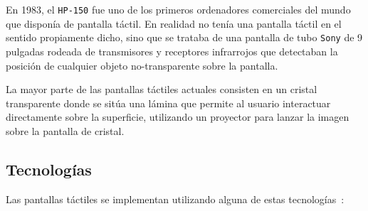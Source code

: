 En 1983, el \texttt{HP-150} fue uno de los primeros ordenadores comerciales del 
mundo que disponía de pantalla táctil. En realidad no tenía una pantalla táctil 
en el sentido propiamente dicho, sino que se trataba de una pantalla de tubo 
\texttt{Sony} de 9 pulgadas rodeada de transmisores y receptores infrarrojos 
que detectaban la posición de cualquier objeto no-transparente sobre la 
pantalla.

La mayor parte de las pantallas táctiles actuales consisten en un cristal 
transparente donde se sitúa una lámina que permite al usuario interactuar 
directamente sobre la superficie, utilizando un proyector para lanzar la 
imagen sobre la pantalla de cristal.

  \subsection{Tecnologías}

Las pantallas táctiles se implementan utilizando alguna de estas
tecnologías~\cite{bib:touchscreen}:

